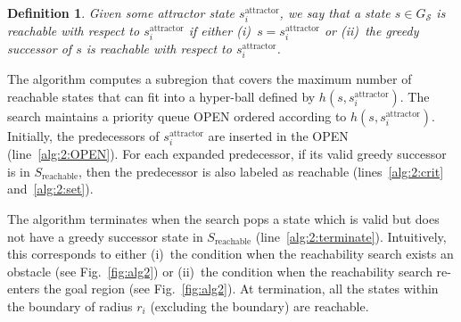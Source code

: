 \documentclass[letterpaper]{article} %
\newcommand{\calS}{\ensuremath{\mathcal{S}}\xspace}
\newcommand{\sAttract}{\ensuremath{s^{\text{attractor}}_i}\xspace}
\newtheorem{definition}{Definition}
\begin{document}
\vspace{2mm}
\begin{definition}
	Given some attractor state \sAttract, we say that a state $s \in G_\calS$ is reachable with respect to \sAttract if either
	(i)~$s = \sAttract$ or
	(ii)~the greedy successor of $s$ is reachable with respect to \sAttract.
\end{definition}


The algorithm computes a subregion that covers the maximum number of reachable states that can fit into a hyper-ball defined by $h(s,\sAttract)$. 
The search maintains a priority queue OPEN ordered according to $h(s,\sAttract)$. Initially, the predecessors of $\sAttract$ are inserted in the OPEN (line~\ref{alg:2:OPEN}). For each expanded predecessor, if its valid greedy successor is in $S_{\text{reachable}}$, then the predecessor is also labeled as reachable (lines~\ref{alg:2:crit} and~\ref{alg:2:set}). 


The algorithm terminates when the search pops a state which is valid but does not have a greedy successor state in $S_{\text{reachable}}$ (line~\ref{alg:2:terminate}). Intuitively, this corresponds to either 
(i)~the condition when the reachability search exists an obstacle (see Fig.~\ref{fig:alg2})
or 
(ii)~the condition when the reachability search re-enters the goal  region (see Fig.~\ref{fig:alg2}).
At termination, all the states within the boundary of radius $r_i$ (excluding the boundary) are reachable.
\end{document}
